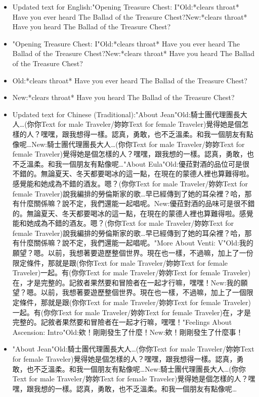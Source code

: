 \documentclass[a4paper,12pt]{article}
\begin{document}
\begin{itemize}
\item Updated text for English:"Opening Treasure Chest: I"Old:*clears throat* Have you ever heard The Ballad of the Treasure Chest?New:*clears throat* Have you heard The Ballad of the Treasure Chest?
\item "Opening Treasure Chest: I"Old:*clears throat* Have you ever heard The Ballad of the Treasure Chest?New:*clears throat* Have you heard The Ballad of the Treasure Chest?
\item Old:*clears throat* Have you ever heard The Ballad of the Treasure Chest?
\item New:*clears throat* Have you heard The Ballad of the Treasure Chest?
\item Updated text for Chinese (Traditional):"About Jean"Old:騎士團代理團長大人…(‍你你Text for male Traveler/妳妳Text for female Traveler‍)覺得她是個怎樣的人？嘿嘿，跟我想得一樣。認真，勇敢，也不乏溫柔。和我一個朋友有點像呢…New:騎士團代理團長大人…(‍你你Text for male Traveler/妳妳Text for female Traveler‍)覺得她是個怎樣的人？嘿嘿，跟我想的一樣。認真，勇敢，也不乏溫柔。和我一個朋友有點像呢…"About Eula"Old:優菈對酒的品位可是很不錯的。無論夏天、冬天都要喝冰的這一點，在現在的蒙德人裡也算難得啦。感覺能和她成為不錯的酒友。嗯？(‍你你Text for male Traveler/妳妳Text for female Traveler‍)說我編排的勞倫斯家的歌…早已經傳到了她的耳朵裡？哈，那有什麼關係嘛？說不定，我們還能一起唱呢。New:優菈對酒的品味可是很不錯的。無論夏天、冬天都要喝冰的這一點，在現在的蒙德人裡也算難得啦。感覺能和她成為不錯的酒友。嗯？(‍你你Text for male Traveler/妳妳Text for female Traveler‍)說我編排的勞倫斯家的歌…早已經傳到了她的耳朵裡？哈，那有什麼關係嘛？說不定，我們還能一起唱呢。"More About Venti: V"Old:我的願望？嗯。以前，我想著要遊歷整個世界。現在也一樣，不過嘛，加上了一份限定條件，那就是跟(‍你你Text for male Traveler/妳妳Text for female Traveler‍)一起。有(‍你你Text for male Traveler/妳妳Text for female Traveler‍)在，才是完整的。記敘者果然要和冒險者在一起才行嘛，嘿嘿！New:我的願望？嗯。以前，我想著要遊歷整個世界。現在也一樣，不過嘛，加上了一個限定條件，那就是跟(‍你你Text for male Traveler/妳妳Text for female Traveler‍)一起。有(‍你你Text for male Traveler/妳妳Text for female Traveler‍)在，才是完整的。記敘者果然要和冒險者在一起才行嘛，嘿嘿！"Feelings About Ascension: Intro"Old:欸！剛剛發生了什麼！New:欸！剛剛發生了什麼事！
\item "About Jean"Old:騎士團代理團長大人…(‍你你Text for male Traveler/妳妳Text for female Traveler‍)覺得她是個怎樣的人？嘿嘿，跟我想得一樣。認真，勇敢，也不乏溫柔。和我一個朋友有點像呢…New:騎士團代理團長大人…(‍你你Text for male Traveler/妳妳Text for female Traveler‍)覺得她是個怎樣的人？嘿嘿，跟我想的一樣。認真，勇敢，也不乏溫柔。和我一個朋友有點像呢…

\end{itemize}
\end{document}
